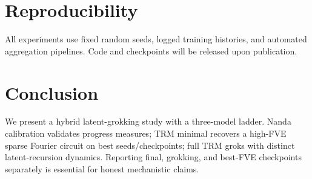\section{Reproducibility}
All experiments use fixed random seeds, logged training histories, and automated aggregation pipelines.
Code and checkpoints will be released upon publication.

\section{Conclusion}
We present a hybrid latent-grokking study with a three-model ladder.
Nanda calibration validates progress measures; TRM minimal recovers a high-FVE sparse Fourier circuit on best seeds/checkpoints; full TRM groks with distinct latent-recursion dynamics.
Reporting final, grokking, and best-FVE checkpoints separately is essential for honest mechanistic claims.
